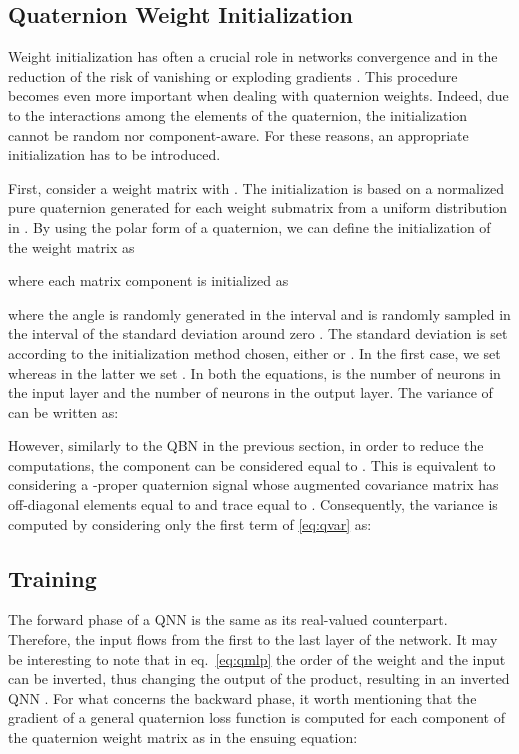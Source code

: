 \documentclass[graybox]{svmult}
\begin{document}
\subsection{Quaternion Weight Initialization}
\label{sec:qwi}
\noindent Weight initialization has often a crucial role in networks convergence and in the reduction of the risk of vanishing or exploding gradients \cite{GlorotInit2010}. This procedure becomes even more important when dealing with quaternion weights. Indeed, due to the interactions among the elements of the quaternion, the initialization cannot be random nor component-aware. For these reasons, an appropriate initialization has to be introduced.

First, consider a weight matrix  with . The initialization is based on a normalized pure quaternion  generated for each weight submatrix from a uniform distribution in . By using the polar form of a quaternion, we can define the initialization of the weight matrix as



\noindent where each matrix component is initialized as



\noindent where the angle  is randomly generated in the interval  and  is randomly sampled in the interval of the standard deviation around zero . The standard deviation is set according to the initialization method chosen, either \cite{GlorotInit2010} or \cite{HeInit2015}. In the first case, we set  whereas in the latter we set . In both the equations,  is the number of neurons in the input layer and  the number of neurons in the output layer. The variance of  can be written as:



However, similarly to the QBN in the previous section, in order to reduce the computations, the component  can be considered equal to  \cite{ParcolletICLR2019, ParcolletAIR2019}. This is equivalent to considering a -proper quaternion signal whose augmented covariance matrix has off-diagonal elements equal to  and trace equal to . Consequently, the variance is computed by considering only the first term of \eqref{eq:qvar} as:



\subsection{Training}

The forward phase of a QNN is the same as its real-valued counterpart. Therefore, the input flows from the first to the last layer of the network. It may be interesting to note that in eq.~\eqref{eq:qmlp} the order of the weight and the input can be inverted, thus changing the output of the product, resulting in an inverted QNN \cite{ParcolletAIR2019, ParcolletICLR2019}.
For what concerns the backward phase, it worth mentioning that the gradient of a general quaternion loss function  is computed for each component of the quaternion weight matrix  as in the ensuing equation:
\end{document}
